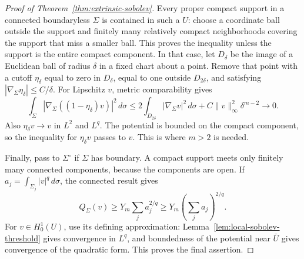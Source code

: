 \begin{proof}[Proof of Theorem~\ref{thm:extrinsic-sobolev}]
Every proper compact support in a connected boundaryless $\Sigma$
is contained in such a $U$: choose a coordinate ball outside the
support and finitely many relatively compact neighborhoods covering
the support that miss a smaller ball. This proves the inequality
unless the support is the entire compact component.
In that case, let $D_\delta$ be the image of a Euclidean ball of radius
$\delta$ in a fixed chart about a point. Remove that point with a
cutoff $\eta_\delta$ equal to zero in $D_\delta$, equal to one outside
$D_{2\delta}$, and satisfying
$|\nabla_\Sigma\eta_\delta|\le C/\delta$.
For Lipschitz $v$, metric comparability gives
\[
 \int_\Sigma|\nabla_\Sigma((1-\eta_\delta)v)|^2\,d\sigma
 \le 2\int_{D_{2\delta}}|\nabla_\Sigma v|^2\,d\sigma
       +C\|v\|_\infty^2\delta^{m-2}\longrightarrow0.
\]
Also $\eta_\delta v\to v$ in $L^2$ and $L^q$. The potential is
bounded on the compact component, so the inequality for
$\eta_\delta v$ passes to $v$. This is where $m>2$ is needed.

Finally, pass to $\Sigma^\circ$ if $\Sigma$ has boundary.
A compact support meets only finitely many connected components,
because the components are open. If
$a_j=\int_{\Sigma_j}|v|^q\,d\sigma$, the connected result gives
\[
 Q_\Sigma(v)\ge Y_m\sum_j a_j^{2/q}
 \ge Y_m\left(\sum_j a_j\right)^{2/q}.
\]
For $v\in H^1_0(U)$, use its defining approximation:
Lemma~\ref{lem:local-sobolev-threshold} gives convergence in $L^q$,
and boundedness of the potential near $\bar U$ gives convergence
of the quadratic form. This proves the final assertion.
\end{proof}
